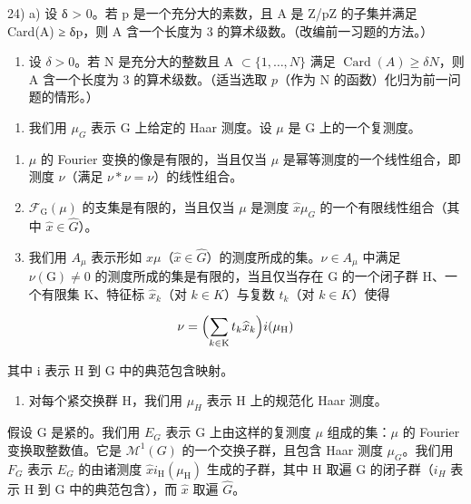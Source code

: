 24) a) 设 δ \textgreater{} 0。若 p 是一个充分大的素数，且 A 是 Z/pZ 的子集并满足 Card(A) ≥ δp，则 A 含一个长度为 3 的算术级数。（改编前一习题的方法。）

\begin{enumerate}
\def\labelenumi{\alph{enumi})}
\setcounter{enumi}{1}
\tightlist
\item
  设 \(\delta > 0\)。若 N 是充分大的整数且 A \(\subset \{1, \ldots, N\}\) 满足 \(\operatorname{Card}(A) \geqslant \delta N\)，则 A 含一个长度为 3 的算术级数。（适当选取 \(p\)（作为 N 的函数）化归为前一问题的情形。）
\end{enumerate}

\begin{enumerate}
\def\labelenumi{\arabic{enumi})}
\setcounter{enumi}{24}
\tightlist
\item
  我们用 \(\mu_{G}\) 表示 G 上给定的 Haar 测度。设 \(\mu\) 是 G 上的一个复测度。
\end{enumerate}

\begin{enumerate}
\def\labelenumi{\alph{enumi})}
\item
  \(\mu\) 的 Fourier 变换的像是有限的，当且仅当 \(\mu\) 是幂等测度的一个线性组合，即测度 \(\nu\)（满足 \(\nu * \nu = \nu\)）的线性组合。
\item
  \(\mathcal{F}_{\mathrm{G}}(\mu)\) 的支集是有限的，当且仅当 \(\mu\) 是测度 \(\widehat{x}\mu_{G}\) 的一个有限线性组合（其中 \(\widehat{x} \in \widehat{G}\)）。
\item
  我们用 \(A_{\mu}\) 表示形如 \(\widehat{x}\mu\)（\(\widehat{x}\in\widehat{G}\)）的测度所成的集。\(\nu\in A_{\mu}\) 中满足 \(\nu(\mathrm{G})\neq0\) 的测度所成的集是有限的，当且仅当存在 G 的一个闭子群 H、一个有限集 K、特征标 \(\widehat{x}_{k}\)（对 \(k\in K\)）与复数 \(t_{k}\)（对 \(k\in K\)）使得
\end{enumerate}

\[
\nu = \Bigl (\sum_ {k \in \mathrm{K}} t _ {k} \widehat {x} _ {k} \Bigr) i (\mu_ {\mathrm{H}})
\]

其中 i 表示 H 到 G 中的典范包含映射。

\begin{enumerate}
\def\labelenumi{\arabic{enumi})}
\setcounter{enumi}{25}
\tightlist
\item
对每个紧交换群 H，我们用 \(\mu_{H}\) 表示 H 上的规范化 Haar 测度。
\end{enumerate}

假设 G 是紧的。我们用 \(E_{G}\) 表示 G 上由这样的复测度 \(\mu\) 组成的集：\(\mu\) 的 Fourier 变换取整数值。它是 \(\mathcal{M}^{1}(G)\) 的一个交换子群，且包含 Haar 测度 \(\mu_{G}\)。我们用 \(F_{G}\) 表示 \(E_{G}\) 的由诸测度 \(\widehat{x} i_{\mathrm{H}}(\mu_{\mathrm{H}})\) 生成的子群，其中 H 取遍 G 的闭子群（\(i_{H}\) 表示 H 到 G 中的典范包含），而 \(\widehat{x}\) 取遍 \(\widehat{G}\)。

